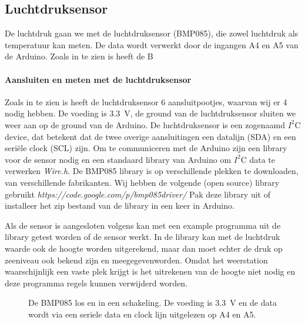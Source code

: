 \subsection{Luchtdruksensor}


De luchtdruk gaan we met de luchtdruksensor (BMP085), die zowel luchtdruk als 
temperatuur kan meten. De data wordt verwerkt door de ingangen A4 en A5 van de Arduino.
Zoals in   te zien is heeft de B

\paragraph{Aansluiten en meten met de luchtdruksensor}

Zoals in  te zien is heeft de luchtdruksensor 6
aansluitpootjes, waarvan wij er 4 nodig hebben. De voeding is
\SI{3.3}{\volt}, de ground van de luchtdruksensor sluiten we weer aan op
de ground van de Arduino. De luchtdruksensor is een zogenaamd $I^{2}$C
device, dat betekent dat de twee overige aansluitingen een datalijn
(SDA) en een seriële clock (SCL) zijn. Om te communiceren met de
Arduino zijn een library voor de sensor nodig en een standaard library
van Arduino om $I^{2}$C data te verwerken \emph{Wire.h}. De BMP085
library is op verschillende plekken te downloaden, van verschillende
fabrikanten. Wij hebben de volgende (open source) library gebruikt
\emph{https://code.google.com/p/bmp085driver/} Pak deze library uit of
installeer het zip bestand van de library in een keer in Arduino.

Als de sensor is aangesloten volgens 
kan met een example programma uit de library getest worden of de sensor
werkt. In de library kan met de luchtdruk waarde ook de hoogte worden
uitgerekend, maar dan moet echter de druk op zeeniveau ook bekend zijn
en meegegevenworden. Omdat het weerstation waarschijnlijk een vaste plek
krijgt is het uitrekenen van de hoogte niet nodig en deze programma
regels kunnen verwijderd worden.

\begin{figure}
    \centering
    \hfill
    \caption{De BMP085 los en in een schakeling. De voeding is \SI{3.3}{\volt} en 
    de data wordt via een seriele data en clock lijn uitgelezen op A4 en A5.}
\end{figure}



